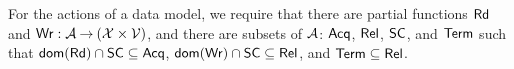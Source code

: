 For the actions of a data model, we require that
there are partial functions $\mathsf{Rd}$ and
$\mathsf{Wr}: \mathcal{A} \mathbin\rightarrow (\mathcal{X} \times \mathcal{V})$, and there are subsets of $\mathcal{A}$:
$\mathsf{Acq}$, $\mathsf{Rel}$, $\mathsf{SC}$, and $\mathsf{Term}$
such that
$\mathsf{dom}(\mathsf{Rd})\cap\mathsf{SC}\subseteq\mathsf{Acq}$,
$\mathsf{dom}(\mathsf{Wr})\cap\mathsf{SC}\subseteq\mathsf{Rel}$, and
$\mathsf{Term}\subseteq\mathsf{Rel}$.

